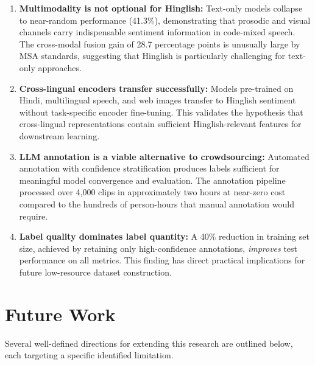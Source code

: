 \begin{enumerate}
    \item \textbf{Multimodality is not optional for Hinglish:} Text-only models collapse to near-random performance (41.3\%), demonstrating that prosodic and visual channels carry indispensable sentiment information in code-mixed speech. The cross-modal fusion gain of 28.7 percentage points is unusually large by MSA standards, suggesting that Hinglish is particularly challenging for text-only approaches.

    \item \textbf{Cross-lingual encoders transfer successfully:} Models pre-trained on Hindi, multilingual speech, and web images transfer to Hinglish sentiment without task-specific encoder fine-tuning. This validates the hypothesis that cross-lingual representations contain sufficient Hinglish-relevant features for downstream learning.

    \item \textbf{LLM annotation is a viable alternative to crowdsourcing:} Automated annotation with confidence stratification produces labels sufficient for meaningful model convergence and evaluation. The annotation pipeline processed over 4,000 clips in approximately two hours at near-zero cost compared to the hundreds of person-hours that manual annotation would require.

    \item \textbf{Label quality dominates label quantity:} A 40\% reduction in training set size, achieved by retaining only high-confidence annotations, \textit{improves} test performance on all metrics. This finding has direct practical implications for future low-resource dataset construction.
\end{enumerate}

\section{Future Work}
\label{sec:futurework}

Several well-defined directions for extending this research are outlined below, each targeting a specific identified limitation.

